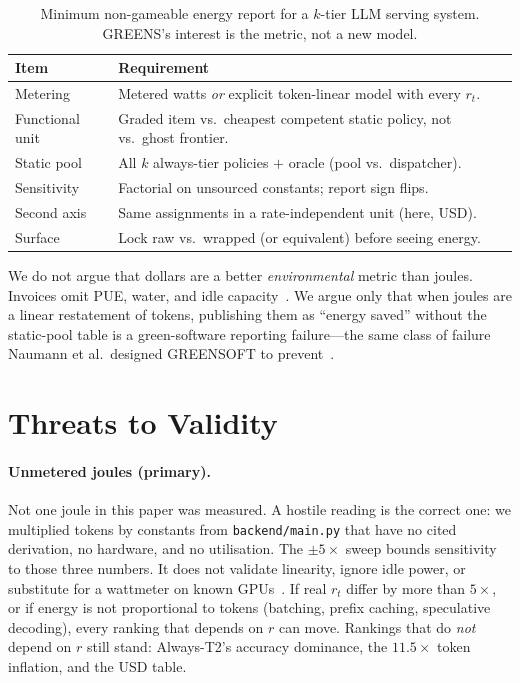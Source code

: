 \documentclass[10pt,conference]{IEEEtran}
\begin{document}
\begin{table}[t]
\caption{Minimum non-gameable energy report for a $k$-tier LLM serving system. GREENS's interest is the metric, not a new model.}
\label{tab:check}
\centering
\setlength{\tabcolsep}{3pt}
\begin{tabular}{lp{}}
\toprule
Item & Requirement \\
\midrule
Metering & Metered watts \emph{or} explicit token-linear model with every $r_t$. \\
Functional unit & Graded item vs.\ cheapest competent static policy, not vs.\ ghost frontier. \\
Static pool & All $k$ always-tier policies $+$ oracle (pool vs.\ dispatcher). \\
Sensitivity & Factorial on unsourced constants; report sign flips. \\
Second axis & Same assignments in a rate-independent unit (here, USD). \\
Surface & Lock raw vs.\ wrapped (or equivalent) before seeing energy. \\
\bottomrule
\end{tabular}
\end{table}

We do not argue that dollars are a better \emph{environmental} metric than joules. Invoices omit PUE, water, and idle capacity~\cite{wu2022sustainable,luccioni2024power}. We argue only that when joules are a linear restatement of tokens, publishing them as ``energy saved'' without the static-pool table is a green-software reporting failure---the same class of failure Naumann et al.\ designed GREENSOFT to prevent~\cite{naumann2011greensoft}.

\section{Threats to Validity}
\label{sec:threats}

\paragraph{Unmetered joules (primary).}
Not one joule in this paper was measured. A hostile reading is the correct one: we multiplied tokens by constants from \texttt{backend/main.py} that have no cited derivation, no hardware, and no utilisation. The $\pm5\times$ sweep bounds sensitivity to those three numbers. It does not validate linearity, ignore idle power, or substitute for a wattmeter on known GPUs~\cite{samsi2023words,luccioni2024power}. If real $r_t$ differ by more than $5\times$, or if energy is not proportional to tokens (batching, prefix caching, speculative decoding), every ranking that depends on $r$ can move. Rankings that do \emph{not} depend on $r$ still stand: Always-T2's accuracy dominance, the $11.5\times$ token inflation, and the USD table.
\end{document}
